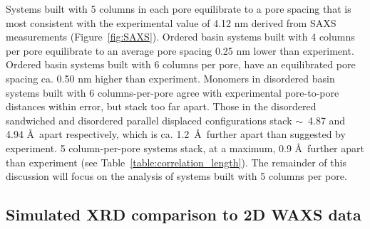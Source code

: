 \documentclass[journal=jpcbfk,manuscript=article]{achemso}
\begin{document}
  Systems built with 5 columns in each pore equilibrate to a pore spacing that
  is most consistent with the experimental value of 4.12 nm derived from SAXS
  measurements (Figure~\ref{fig:SAXS}). Ordered basin systems built with 4
  columns per pore equilibrate to an average pore spacing 0.25 nm lower than
  experiment. Ordered basin systems built with 6 columns per pore, have an
  equilibrated pore spacing ca. 0.50 nm higher than experiment.  Monomers in
  disordered basin systems built with 6 columns-per-pore agree with experimental
  pore-to-pore distances within error, but stack too far apart. Those in the
  disordered sandwiched and disordered parallel displaced configurations stack
  $\sim$~4.87 and 4.94 \AA~apart respectively, which is ca. 1.2~\AA~further apart
  than suggested by experiment. 5 column-per-pore systems stack, at a maximum,
  0.9 \AA~further apart than experiment (see 
  Table~\ref{table:correlation_length}).  The remainder of this discussion will
  focus on the analysis of systems built with 5 columns per pore. 


  
  \subsection{Simulated XRD comparison to 2D WAXS data}
  
\end{document}
